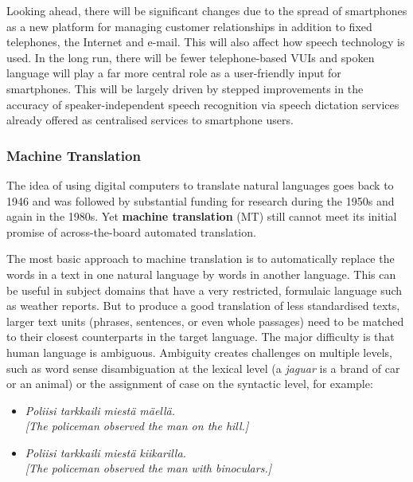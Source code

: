 \begin{multicols}{2}
  Looking ahead, there will be significant changes due to the spread of smartphones as a new platform for managing customer relationships in addition to fixed telephones, the Internet and e-mail. This will also affect how speech technology is used. In the long run, there will be fewer telephone-based VUIs and spoken language will play a far more central role as a user-friendly input for smartphones. This will be largely driven by stepped improvements in the accuracy of speaker-independent speech recognition via speech dictation services already offered as centralised services to smartphone users.

\subsubsection{Machine Translation}

The idea of using digital computers to translate natural languages goes back to
1946 and was followed by substantial funding for research during the 1950s and
again in the 1980s. Yet \textbf{machine translation} (MT) still cannot meet its initial
promise of across-the-board automated translation.


The most basic approach to machine translation is to automatically replace the words in a text in one natural language by words in another language. This can be useful in subject domains that have a very restricted, formulaic language such as weather reports. But to produce a good translation of less standardised texts, larger text units (phrases, sentences, or even whole passages) need to be matched to their closest counterparts in the target language. The major difficulty is that human language is ambiguous. Ambiguity creates challenges on multiple levels, such as word sense disambiguation at the lexical level (a \textit{jaguar} is a brand of car or an animal) or the assignment of case on the syntactic level, for example:

\begin{itemize}
\item {\foreignlanguage{finnish}
    {\textit{Poliisi tarkkaili miestä mäellä.}}}\\
  \textit{[The policeman observed the man on the hill.]}
  
\item {\foreignlanguage{finnish}{\textit{Poliisi tarkkaili miestä
        kiikarilla.}}}\\
  \textit{[The policeman observed the man with binoculars.]}
\end{itemize}


\end{multicols}
